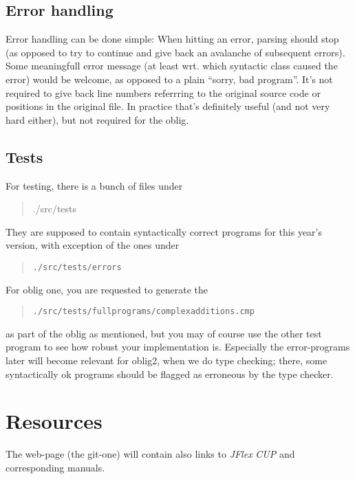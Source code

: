 \documentclass[10pt,freeform]{handout}[2014/08/13]
\begin{document}
\subsection{Error handling}
\label{sec:error-handling}

Error handling can be done simple: When hitting an error, parsing should
stop (as opposed to try to continue and give back an avalanche of
subsequent errors). Some meaningfull error message (at least wrt. which
syntactic class caused the error) would be welcome, as opposed to a plain
``sorry, bad program''. It's not required to give back line numbers
referrring to the original source code or positions in the original
file. In practice that's definitely useful (and not very hard either), but
not required for the oblig.




\subsection{Tests}
\label{sec:tests}

For testing, there is a bunch of files under

\begin{quote}
  ./src/tests
\end{quote}

They are supposed to contain syntactically correct programs for this year's
version, with exception of the ones under
\begin{quote}
  \texttt{./src/tests/errors}
\end{quote}


For oblig one, you are requested to generate the 
\begin{quote}
  \texttt{./src/tests/fullprograms/complexadditions.cmp}  
\end{quote}
as part of the oblig as mentioned, but you may of course use the other test
program to see how robust your implementation is. Especially the
error-programs later will become relevant for oblig2, when we do type
checking; there, some syntactically ok programs should be flagged as
erroneous by the type checker.







\section{Resources}
\label{sec:resources}

The web-page (the git-one) will contain also links to \textsl{JFlex}
\textsl{CUP} and corresponding manuals.
\end{document}
